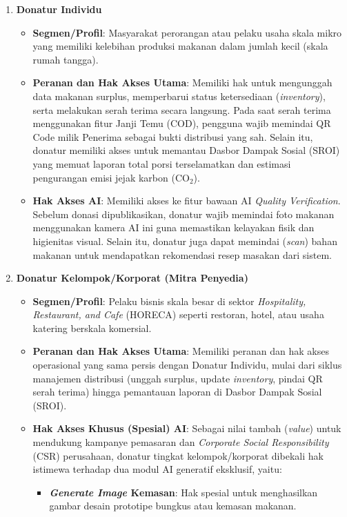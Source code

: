 \begin{enumerate}
    \item \textbf{Donatur Individu}
    \begin{itemize}
        \item \textbf{Segmen/Profil}: Masyarakat perorangan atau pelaku usaha skala mikro yang memiliki kelebihan produksi makanan dalam jumlah kecil (skala rumah tangga).
        \item \textbf{Peranan dan Hak Akses Utama}: Memiliki hak untuk mengunggah data makanan surplus, memperbarui status ketersediaan (\textit{inventory}), serta melakukan serah terima secara langsung. Pada saat serah terima menggunakan fitur Janji Temu (COD), pengguna wajib memindai QR Code milik Penerima sebagai bukti distribusi yang sah. Selain itu, donatur memiliki akses untuk memantau Dasbor Dampak Sosial (SROI) yang memuat laporan total porsi terselamatkan dan estimasi pengurangan emisi jejak karbon (CO$_2$).
        \item \textbf{Hak Akses AI}: Memiliki akses ke fitur bawaan AI \textit{Quality Verification}. Sebelum donasi dipublikasikan, donatur wajib memindai foto makanan menggunakan kamera AI ini guna memastikan kelayakan fisik dan higienitas visual. Selain itu, donatur juga dapat memindai (\textit{scan}) bahan makanan untuk mendapatkan rekomendasi resep masakan dari sistem.
    \end{itemize}
    \item \textbf{Donatur Kelompok/Korporat (Mitra Penyedia)}
    \begin{itemize}
        \item \textbf{Segmen/Profil}: Pelaku bisnis skala besar di sektor \textit{Hospitality, Restaurant, and Cafe} (HORECA) seperti restoran, hotel, atau usaha katering berskala komersial.
        \item \textbf{Peranan dan Hak Akses Utama}: Memiliki peranan dan hak akses operasional yang sama persis dengan Donatur Individu, mulai dari siklus manajemen distribusi (unggah surplus, update \textit{inventory}, pindai QR serah terima) hingga pemantauan laporan di Dasbor Dampak Sosial (SROI).
        \item \textbf{Hak Akses Khusus (Spesial) AI}: Sebagai nilai tambah (\textit{value}) untuk mendukung kampanye pemasaran dan \textit{Corporate Social Responsibility} (CSR) perusahaan, donatur tingkat kelompok/korporat dibekali hak istimewa terhadap dua modul AI generatif eksklusif, yaitu:
        \begin{itemize}
            \item \textbf{\textit{Generate Image} Kemasan}: Hak spesial untuk menghasilkan gambar desain prototipe bungkus atau kemasan makanan.

\end{itemize}
\end{itemize}
\end{enumerate}
